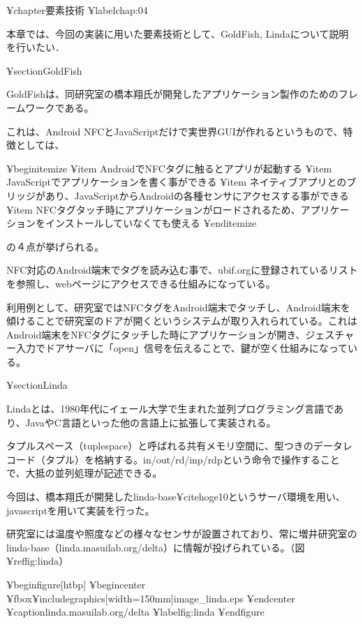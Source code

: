 ¥chapter{要素技術}
¥label{chap:04}

本章では、今回の実装に用いた要素技術として、GoldFish, Lindaについて説明を行いたい．

¥section{GoldFish}

GoldFishは、同研究室の橋本翔氏が開発したアプリケーション製作のためのフレームワークである。

これは、Android NFCとJavaScriptだけで実世界GUIが作れるというもので、特徴としては、

¥begin{itemize}
   ¥item AndroidでNFCタグに触るとアプリが起動する
   ¥item JavaScriptでアプリケーションを書く事ができる
   ¥item ネイティブアプリとのブリッジがあり、JavaScriptからAndroidの各種センサにアクセスする事ができる
    ¥item NFCタグタッチ時にアプリケーションがロードされるため、アプリケーションをインストールしていなくても使える
 ¥end{itemize}
 
の４点が挙げられる。


NFC対応のAndroid端末でタグを読み込む事で、ubif.orgに登録されているリストを参照し、webページにアクセスできる仕組みになっている。

利用例として、研究室ではNFCタグをAndroid端末でタッチし、Android端末を傾けることで研究室のドアが開くというシステムが取り入れられている。これはAndroid端末をNFCタグにタッチした時にアプリケーションが開き、ジェスチャー入力でドアサーバに「open」信号を伝えることで、鍵が空く仕組みになっている。


¥section{Linda}

Lindaとは、1980年代にイェール大学で生まれた並列プログラミング言語であり、JavaやC言語といった他の言語上に拡張して実装される。

タプルスペース（tuplespace）と呼ばれる共有メモリ空間に、型つきのデータレコード（タプル）を格納する。in/out/rd/inp/rdpという命令で操作することで、大抵の並列処理が記述できる。

今回は、橋本翔氏が開発したlinda-base¥cite{hoge10}というサーバ環境を用い、javascriptを用いて実装を行った。

研究室には温度や照度などの様々なセンサが設置されており、常に増井研究室のlinda-base（linda.masuilab.org/delta）に情報が投げられている。（図¥ref{fig:linda}）

¥begin{figure}[htbp]
    ¥begin{center}
       ¥fbox{¥includegraphics[width=150mm]{image_linda.eps}}
    ¥end{center}
    ¥caption{linda.masuilab.org/delta}
    ¥label{fig:linda}
¥end{figure}






